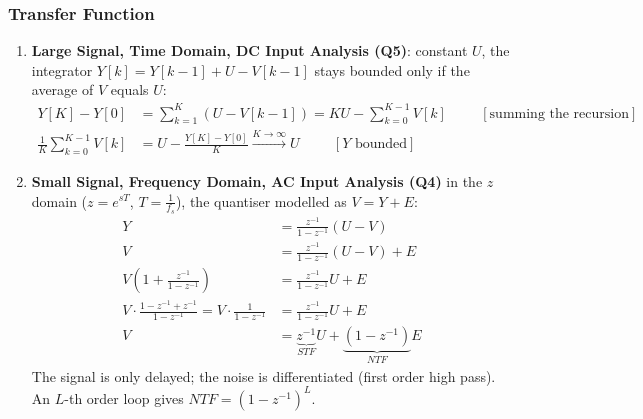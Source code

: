 \subsubsection{Transfer Function}
\begin{enumerate}
  \item \textbf{Large Signal, Time Domain, DC Input Analysis (Q5)}: constant \(U\), the integrator
    \(Y[k] = Y[k-1] + U - V[k-1]\) stays bounded only if the average of \(V\) equals \(U\):
    \begin{align*}
      Y[K] - Y[0] &= \sum_{k=1}^{K}(U - V[k-1]) = K U - \sum_{k=0}^{K-1} V[k] \hspace{1cm} [\text{summing the recursion}] \\
      \frac{1}{K}\sum_{k=0}^{K-1} V[k] &= U - \frac{Y[K] - Y[0]}{K} \xrightarrow{K \to \infty} U \hspace{1cm} [Y \text{ bounded}]
    \end{align*}
  \item \textbf{Small Signal, Frequency Domain, AC Input Analysis (Q4)} in the \(z\) domain
    (\(z = e^{sT}\), \(T = \frac{1}{f_s}\)), the quantiser modelled as \(V = Y + E\):
\begin{align*}
  Y &= \frac{z^{-1}}{1 - z^{-1}}(U - V) \\
  V &= \frac{z^{-1}}{1 - z^{-1}}(U - V) + E \\
  V\left(1 + \frac{z^{-1}}{1 - z^{-1}}\right) &= \frac{z^{-1}}{1 - z^{-1}} U + E \\
  V \cdot \frac{1 - z^{-1} + z^{-1}}{1 - z^{-1}} = V \cdot \frac{1}{1 - z^{-1}} &= \frac{z^{-1}}{1 - z^{-1}} U + E \\
  V &= \underbrace{z^{-1}}_{STF} U + \underbrace{(1 - z^{-1})}_{NTF} E \tag{1}
\end{align*}
    The signal is only delayed; the noise is differentiated (first order high pass). An \(L\)-th
    order loop gives \(NTF = (1 - z^{-1})^L\).
\end{enumerate}

